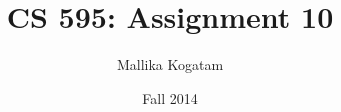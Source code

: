 \documentclass[letterpaper]{report}
\begin{document}
\renewcommand{\thesection}{\arabic{section}}

\author{Mallika Kogatam}
\title{CS 595: Assignment 10}

\date{Fall 2014}

\maketitle

\tableofcontents
\newpage








\nocite{*}
\end{document}
